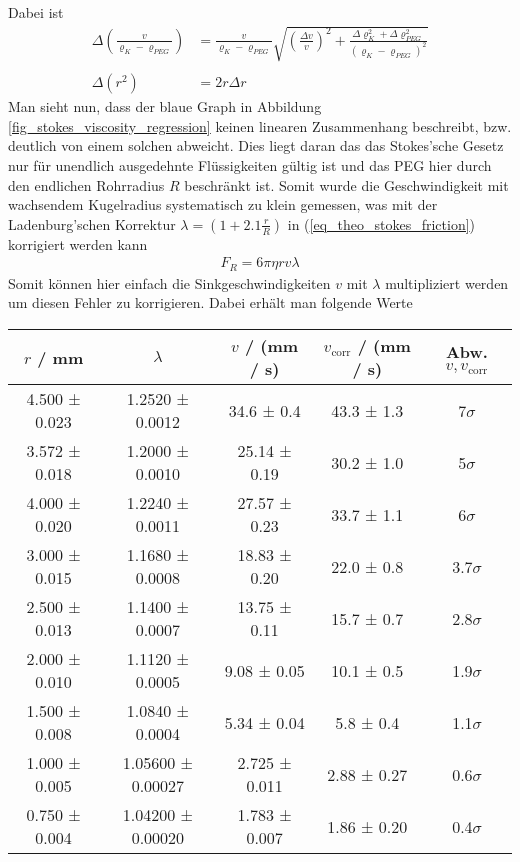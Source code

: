 \documentclass[12pt,a4paper,german]{scrartcl}
\numberwithin{equation}{section}
\begin{document}
  Dabei ist
  \begin{align}
    \Delta \left(\frac{v}{\varrho_K - \varrho_{PEG}} \right) &= \frac{v}{\varrho_K - \varrho_{PEG}} \sqrt{\left(\frac{\Delta v}{v} \right)^2 + \frac{\Delta \varrho_K^2 + \Delta \varrho_{PEG}^2}{(\varrho_K - \varrho_{PEG})^2}} \nonumber \\
    \nonumber \\
    \Delta (r^2) &= 2 r \Delta r
  \end{align}
  Man sieht nun, dass der blaue Graph in Abbildung \ref{fig_stokes_viscosity_regression} keinen linearen Zusammenhang beschreibt, bzw. deutlich von einem solchen abweicht.
  Dies liegt daran das das Stokes'sche Gesetz nur für unendlich ausgedehnte Flüssigkeiten gültig ist und das PEG hier durch den endlichen Rohrradius $R$ beschränkt ist.
  Somit wurde die Geschwindigkeit mit wachsendem Kugelradius systematisch zu klein gemessen, was mit der Ladenburg'schen Korrektur $\lambda = (1 + 2.1 \frac{r}{R})$ in (\ref{eq_theo_stokes_friction}) korrigiert werden kann
  \begin{align}
    F_R = 6 \pi \eta r v \lambda
  \end{align}
  Somit können hier einfach die Sinkgeschwindigkeiten $v$ mit $\lambda$ multipliziert werden um diesen Fehler zu korrigieren. Dabei erhält man folgende Werte
  \begin{center}
    \begin{tabular}{c|c|c|c|c}
      $r$ / mm & $\lambda$ & $v$ / (mm / s) & $v_\text{corr}$ / (mm / s) & Abw. $v, v_\text{corr}$ \\
      \hline
      4.500 ± 0.023 &  1.2520 ± 0.0012  &  34.6 ± 0.4   &   43.3 ± 1.3    &     7$\sigma$ \\
      3.572 ± 0.018 &  1.2000 ± 0.0010  & 25.14 ± 0.19  &   30.2 ± 1.0    &     5$\sigma$ \\
      4.000 ± 0.020 &  1.2240 ± 0.0011  & 27.57 ± 0.23  &   33.7 ± 1.1    &     6$\sigma$ \\
      3.000 ± 0.015 &  1.1680 ± 0.0008  & 18.83 ± 0.20  &   22.0 ± 0.8    &   3.7$\sigma$ \\
      2.500 ± 0.013 &  1.1400 ± 0.0007  & 13.75 ± 0.11  &   15.7 ± 0.7    &   2.8$\sigma$ \\
      2.000 ± 0.010 &  1.1120 ± 0.0005  &  9.08 ± 0.05  &   10.1 ± 0.5    &   1.9$\sigma$ \\
      1.500 ± 0.008 &  1.0840 ± 0.0004  &  5.34 ± 0.04  &    5.8 ± 0.4    &   1.1$\sigma$ \\
      1.000 ± 0.005 & 1.05600 ± 0.00027 & 2.725 ± 0.011 &   2.88 ± 0.27   &   0.6$\sigma$ \\
      0.750 ± 0.004 & 1.04200 ± 0.00020 & 1.783 ± 0.007 &   1.86 ± 0.20   &   0.4$\sigma$
    \end{tabular}
    \label{table_v_correction}
  \end{center}
\end{document}

